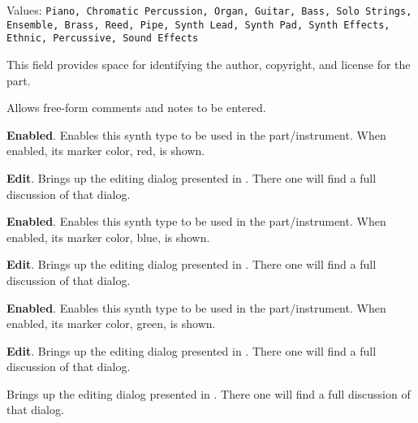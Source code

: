    Values: \texttt{Piano, Chromatic Percussion, Organ, Guitar, Bass,
              Solo Strings, Ensemble, Brass, Reed, Pipe,
              Synth Lead, Synth Pad, Synth Effects, Ethnic,
              Percussive, Sound Effects}

   This field provides space for identifying the author, copyright, and
   license for the part.

   Allows free-form comments and notes to be entered.


   \begin{enumber}
      \item \textbf{Enabled}.
      Enables this synth type to be used in the part/instrument.
      When enabled, its marker color, red, is shown.
      \item \textbf{Edit}.
      Brings up the editing dialog presented in
      .
      There one will find a full discussion of that dialog.
   \end{enumber}


   \begin{enumber}
      \item \textbf{Enabled}.
      Enables this synth type to be used in the part/instrument.
      When enabled, its marker color, blue, is shown.
      \item \textbf{Edit}.
      Brings up the editing dialog presented in
      .
      There one will find a full discussion of that dialog.
   \end{enumber}


   \begin{enumber}
      \item \textbf{Enabled}.
      Enables this synth type to be used in the part/instrument.
      When enabled, its marker color, green, is shown.
      \item \textbf{Edit}.
      Brings up the editing dialog presented in
      .
      There one will find a full discussion of that dialog.
   \end{enumber}

   Brings up the editing dialog presented in
   .
   There one will find a full discussion of that dialog.

